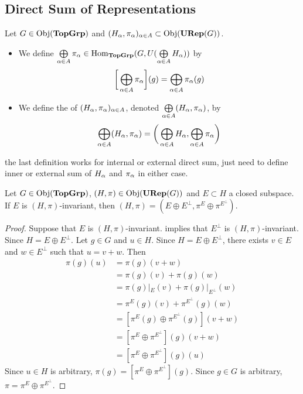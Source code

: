 \documentclass{book}
\begin{document}
	\subsection{Direct Sum of Representations}
	
	\begin{defn}
		Let $G \in \operatorname{Obj}(\operatorname*{\text{\textbf{TopGrp}}})$ and $(H_{\alpha}, \pi_{\alpha})_{\alpha \in A} \subset \operatorname{Obj}(\operatorname*{\text{\textbf{URep}}}(G))$. 
		\begin{itemize}
			\item We define $\bigoplus\limits_{\alpha \in A} \pi_{\alpha} \in \operatorname{Hom}_{\operatorname*{\text{\textbf{TopGrp}}}}(G, U(\bigoplus\limits_{\alpha \in A} H_{\alpha}))$ by 
			$$\bigg[ \bigoplus\limits_{\alpha \in A} \pi_{\alpha} \bigg](g) = \bigoplus\limits_{\alpha \in A} \pi_{\alpha}(g)$$
			\item We define the  of $(H_{\alpha}, \pi_{\alpha})_{\alpha \in A}$, denoted $\bigoplus\limits_{\alpha \in A} (H_{\alpha}, \pi_{\alpha})$, by 
			$$\bigoplus\limits_{\alpha \in A} (H_{\alpha}, \pi_{\alpha}) = \bigg(\bigoplus\limits_{\alpha \in A} H_{\alpha}, \bigoplus\limits_{\alpha \in A} \pi_{\alpha} \bigg)$$ 
		\end{itemize}
	\end{defn}

	\begin{note}
		 the last definition works for internal or external direct sum, just need to define inner or external sum of $H_{\alpha}$ and $\pi_{\alpha}$ in either case. 
	\end{note}

	\begin{ex}
		Let $G \in \operatorname{Obj}(\operatorname*{\text{\textbf{TopGrp}}})$, $(H, \pi) \in \operatorname{Obj}(\operatorname*{\text{\textbf{URep}}}(G))$ and $E \subset H$ a closed subspace. If $E$ is $(H, \pi)$-invariant, then $(H, \pi) = (E \oplus E^{\perp}, \pi^E \oplus \pi^{E^{\perp}})$.
	\end{ex}
	
	\begin{proof}
		Suppose that  $E$ is $(H, \pi)$-invariant.  implies that $E^{\perp}$ is $(H, \pi)$-invariant. Since $H = E \oplus E^{\perp}$. Let $g \in G$ and $u \in H$. Since $H = E \oplus E^{\perp}$, there exists $v \in E$ and $w \in E^{\perp}$ such that $u = v + w$. Then  
		\begin{align*}
			\pi(g)(u)
			& = \pi(g)(v +w) \\
			& = \pi(g)(v) + \pi(g)(w) \\
			& = \pi(g)|_E(v) + \pi(g)|_{E^{\perp}}(w) \\
			& = \pi^E(g)(v) + \pi^{E^{\perp}}(g)(w) \\
			& = [\pi^E(g) \oplus \pi^{E^{\perp}}(g)](v+w) \\
			& = [\pi^E \oplus \pi^{E^{\perp}}](g)(v+w) \\
			& = [\pi^E \oplus \pi^{E^{\perp}}](g)(u)
		\end{align*}
		 Since $u \in H$ is arbitrary, $\pi(g) = [\pi^E \oplus \pi^{E^{\perp}}](g)$. Since $g \in G$ is arbitrary, $\pi = \pi^E \oplus \pi^{E^\perp}$.
	\end{proof}
	
\end{document}
